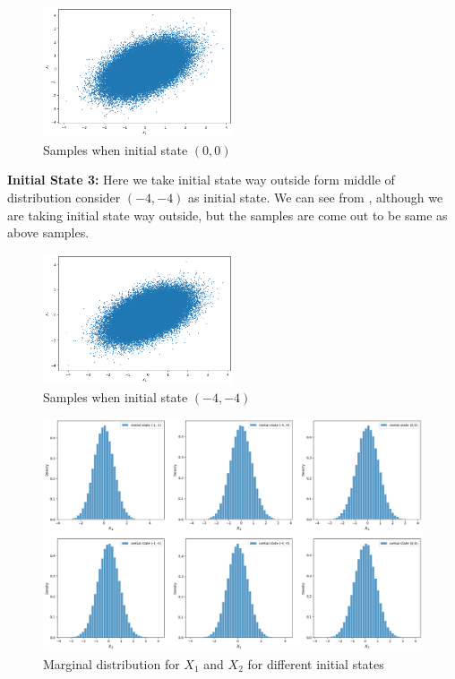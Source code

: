 \begin{example}
    \begin{figure}[H]
        \centering
        \includegraphics[width=0.5\textwidth]{images/gibbs/example1/init2.png}
        \caption{Samples when initial state $(0,0)$}
    \end{figure}

    \textbf{Initial State 3:} Here we take initial state way outside form middle of distribution consider $ (-4,-4) $ as initial state. We can see from , although we are taking initial state way outside, but the samples are come out to be same as above samples. 


    \begin{figure}[H]
        \centering
        \includegraphics[width=0.5\textwidth]{images/gibbs/example1/init3.png}
        \caption{Samples when initial state $(-4,-4)$}
        \label{fig:gb ex1 sample 3}
    \end{figure}

    \begin{figure}[H]
        \centering
        \includegraphics[width=1\textwidth]{images/gibbs/example1/marginal-distributions.png}
        \caption{Marginal distribution for $ X_1 $ and $ X_2 $ for different initial states}
    \end{figure}

\end{example}


